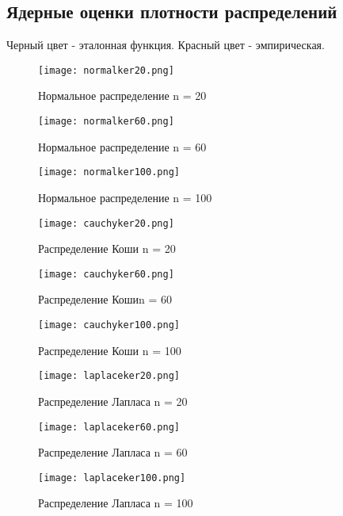 \documentclass[a4]{article}
\begin{document}
		\subsection{Ядерные оценки плотности распределений}
		Черный цвет - эталонная функция. Красный цвет - эмпирическая.
		\begin{center}
			\begin{figure}[h!]
				\texttt{[image: normalker20.png]} 
				\caption[Нормальное распределение n = 20]{Нормальное распределение n = 20}
			\end{figure}
			\newpage
			\begin{figure}[h!]
				\texttt{[image: normalker60.png]} 
				\caption[Нормальное распределение n = 60]{Нормальное распределение n = 60}
			\end{figure}
			\newpage
			\begin{figure}[h!]
				\texttt{[image: normalker100.png]} 
				\caption[Нормальное распределение n = 100]{Нормальное распределение n = 100}
			\end{figure}
			\newpage
			\begin{figure}[h!]
				\texttt{[image: cauchyker20.png]}
				\caption[Распределение Коши n = 20]{Распределение Коши n = 20}
			\end{figure}
			\newpage
			\begin{figure}[h!]
				\texttt{[image: cauchyker60.png]}
				\caption[Распределение Коши n = 60]{Распределение Кошиn = 60}
			\end{figure}
			\newpage
			\begin{figure}[h!]
				\texttt{[image: cauchyker100.png]}
				\caption[Распределение Коши n = 100]{Распределение Коши n = 100}
			\end{figure}
			\newpage
			\begin{figure}[h!]
				\texttt{[image: laplaceker20.png]}
				\caption[Распределение Лапласа n = 20]{Распределение Лапласа n = 20}
			\end{figure}
			\newpage
			\begin{figure}[h!]
				\texttt{[image: laplaceker60.png]}
				\caption[Распределение Лапласа n = 60]{Распределение Лапласа n = 60}
			\end{figure}
			\newpage
			\begin{figure}[h!]
				\texttt{[image: laplaceker100.png]}
				\caption[Распределение Лапласа n = 100]{Распределение Лапласа n = 100}

\end{figure}
\end{center}
\end{document}

